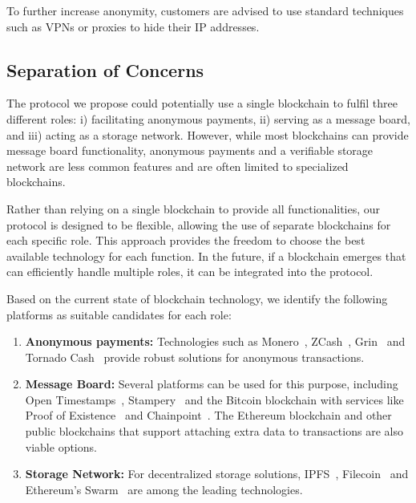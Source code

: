 \documentclass[pdftex,twocolumn,epjc3]{svjour3}
\begin{document}
To further increase anonymity, customers are advised to use standard techniques such as VPNs or proxies to hide their IP addresses.

\subsection{Separation of Concerns}\label{sec:separation-of-concerns}

\begin{sloppypar}
The protocol we propose could potentially use a single blockchain to fulfil three different roles: i) facilitating anonymous payments, ii) serving as a message board, and iii) acting as a storage network. However, while most blockchains can provide message board functionality, anonymous payments and a verifiable storage network are less common features and are often limited to specialized blockchains.

Rather than relying on a single blockchain to provide all functionalities, our protocol is designed to be flexible, allowing the use of separate blockchains for each specific role. This approach provides the freedom to choose the best available technology for each function. In the future, if a blockchain emerges that can efficiently handle multiple roles, it can be integrated into the protocol.

Based on the current state of blockchain technology, we identify the following platforms as suitable candidates for each role:
\begin{enumerate}
  \item \textbf{Anonymous payments:} Technologies such as Monero~\cite{vansaberhagenCryptoNote2013}, ZCash~\cite{ben-sassonZerocashDecentralizedAnonymous2014}, Grin~\cite{fuchsbauerAggregateCashSystems2019} and Tornado Cash~\cite{pertsevTornadoCashPrivacy2019} provide robust solutions for anonymous transactions.
  \item \textbf{Message Board:} Several platforms can be used for this purpose, including Open Timestamps~\cite{opentimestampsTimestampingProofStandard}, Stampery~\cite{crespoStamperyBlockchainTimestamping2017} and the Bitcoin blockchain with services like Proof of Existence~\cite{proofofexistenceWebApplicationProve} and Chainpoint~\cite{chainpointBlockchainProofAnchoring}. The Ethereum blockchain and other public blockchains that support attaching extra data to transactions are also viable options.
  \item \textbf{Storage Network:} For decentralized storage solutions, IPFS~\cite{benetIPFSContentAddressed2014}, Filecoin~\cite{protocollabsFilecoinDecentralizedStorage2017} and Ethereum's Swarm~\cite{teamSWARMStorageCommunication2021} are among the leading technologies.
\end{enumerate}
\end{sloppypar}
\end{document}
